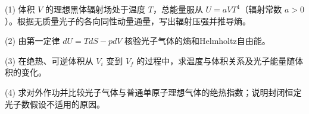 (1) 体积 \(V\) 的理想黑体辐射场处于温度 \(T\)，总能量服从 \(U=aVT^4\)（辐射常数 \(a>0\)）。根据无质量光子的各向同性动量通量，写出辐射压强并推导熵。

(2) 由第一定律 \(dU=TdS-pdV\) 核验光子气体的熵和Helmholtz自由能。

(3) 在绝热、可逆体积从 \(V_i\) 变到 \(V_f\) 的过程中，求温度与体积关系及光子能量随体积的变化。

(4) 求对外作功并比较光子气体与普通单原子理想气体的绝热指数；说明封闭恒定光子数假设不适用的原因。
